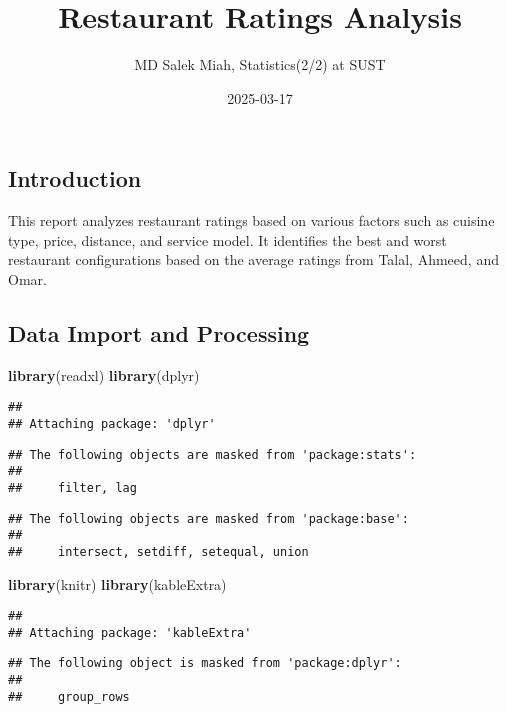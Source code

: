 \documentclass[
]{article}
\title{Restaurant Ratings Analysis}
\author{MD Salek Miah, Statistics(2/2) at SUST}
\date{2025-03-17}
\newenvironment{Shaded}{\begin{snugshade}}{\end{snugshade}}
\newcommand{\FunctionTok}[1]{\textcolor[rgb]{0.13,0.29,0.53}{\textbf{#1}}}
\newcommand{\NormalTok}[1]{#1}
\begin{document}
\maketitle

\subsection{Introduction}\label{introduction}

This report analyzes restaurant ratings based on various factors such as
cuisine type, price, distance, and service model. It identifies the best
and worst restaurant configurations based on the average ratings from
Talal, Ahmeed, and Omar.

\subsection{Data Import and
Processing}\label{data-import-and-processing}

\begin{Shaded}
\begin{Highlighting}[]
\FunctionTok{library}\NormalTok{(readxl)}
\FunctionTok{library}\NormalTok{(dplyr)}
\end{Highlighting}
\end{Shaded}

\begin{verbatim}
## 
## Attaching package: 'dplyr'
\end{verbatim}

\begin{verbatim}
## The following objects are masked from 'package:stats':
## 
##     filter, lag
\end{verbatim}

\begin{verbatim}
## The following objects are masked from 'package:base':
## 
##     intersect, setdiff, setequal, union
\end{verbatim}

\begin{Shaded}
\begin{Highlighting}[]
\FunctionTok{library}\NormalTok{(knitr)}
\FunctionTok{library}\NormalTok{(kableExtra)}
\end{Highlighting}
\end{Shaded}

\begin{verbatim}
## 
## Attaching package: 'kableExtra'
\end{verbatim}

\begin{verbatim}
## The following object is masked from 'package:dplyr':
## 
##     group_rows
\end{verbatim}
\end{document}
